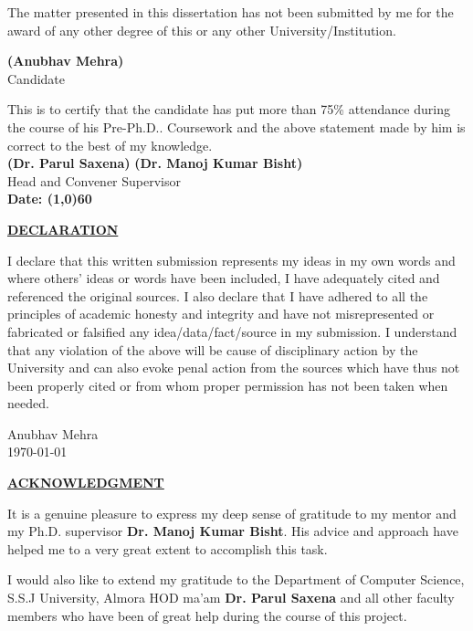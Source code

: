 \documentclass[a4paper, 12pt]{article}
\begin{document}
\begin{sloppypar}
The matter presented in this dissertation has not been submitted by me for the award of any other degree of this or any other University/Institution.
\vspace*{1cm}
\begin{flushright}
\textbf{(Anubhav Mehra)}\\
Candidate\\
\end{flushright}

This is to certify that the candidate has put more than 75\% attendance during the course of his Pre-Ph.D.. Coursework and the above  statement made by him is correct to the best of my knowledge.\\ [1cm]
\textbf{(Dr. Parul Saxena)} \hspace*{6.9cm}
\textbf{(Dr. Manoj Kumar Bisht)}\\
Head and Convener \hspace*{9.5cm} Supervisor\\ [2cm]
\textbf{Date: \line(1,0){60}}
\thispagestyle{empty}
\clearpage

\begin{center}
\textbf{\underline{DECLARATION}}
\end{center}
I declare that this written submission represents my ideas in my own words and where others' ideas or words have been included, I have adequately cited and referenced the original sources. I also declare that I have adhered to all the principles of academic honesty and integrity and have not  misrepresented or fabricated or falsified any idea/data/fact/source in my submission. I understand that any violation of the above will be cause of disciplinary action by the University and can also evoke penal action from the sources which have thus not been properly cited or from whom proper permission has not been taken when needed.
\begin{flushright}
Anubhav Mehra \\
\today
\end{flushright}
\thispagestyle{empty}
\clearpage

\begin{center}
\textbf{\underline{ACKNOWLEDGMENT}}
\end{center}
It is a genuine pleasure to express my deep sense of gratitude to my mentor and my Ph.D. supervisor \textbf{Dr. Manoj Kumar Bisht}. His advice and approach have helped me to a very great extent to accomplish this task. 

I would also like to extend my gratitude to the Department of Computer Science, S.S.J University, Almora HOD ma'am \textbf{Dr. Parul Saxena} and all other faculty members who have been of great help during the course of this project.


\end{sloppypar}
\end{document}
